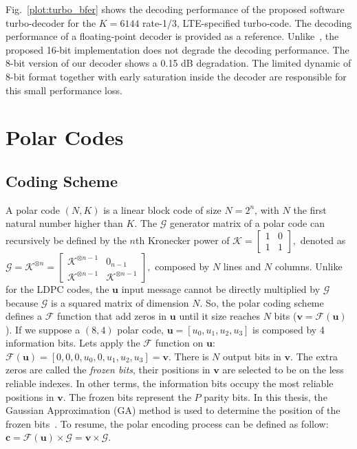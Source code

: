 Fig.~\ref{plot:turbo_bfer} shows the decoding performance of the proposed
software turbo-decoder for the $K = 6144$ rate-1/3, LTE-specified turbo-code.
The decoding performance of a floating-point decoder is provided as a reference.
Unlike~\cite{Wu2013}, the proposed 16-bit implementation does not degrade the
decoding performance. The 8-bit version of our decoder shows a 0.15 dB
degradation. The limited dynamic of 8-bit format together with early saturation
inside the decoder are responsible for this small performance loss.

\section{Polar Codes}
\label{sec:alg_polar_decoders}

\subsection{Coding Scheme}

A polar code $(N,K)$ is a linear block code of size $N = 2^n$, with $N$ the
first natural number higher than $K$. The $\bm{\mathcal{G}}$ generator matrix of
a polar code can recursively be defined by the $n$th Kronecker power of
$\bm{\mathcal{K}} =
\begin{bmatrix}
1 & 0 \\
1 & 1
\end{bmatrix},$
denoted as
$
\bm{\mathcal{G}} = \bm{\mathcal{K}}^{\otimes n} =
\begin{bmatrix}
\bm{\mathcal{K}}^{\otimes n-1} & 0_{n -1} \\
\bm{\mathcal{K}}^{\otimes n-1} & \bm{\mathcal{K}}^{\otimes n-1}
\end{bmatrix},
$
composed by $N$ lines and $N$ columns. Unlike for the LDPC codes, the $\bm{u}$
input message cannot be directly multiplied by $\bm{\mathcal{G}}$ because
$\bm{\mathcal{G}}$ is a squared matrix of dimension $N$. So, the polar coding
scheme defines a $\mathcal{F}$ function that add zeros in $\bm{u}$ until it size
reaches $N$ bits ($\bm{v} = \mathcal{F}(\bm{u})$). If we suppose a $(8,4)$ polar
code, $\bm{u} = [u_0, u_1, u_2, u_3]$ is composed by 4 information bits. Lets
apply the $\mathcal{F}$ function on $\bm{u}$: $\mathcal{F}(\bm{u}) =
[0, 0, 0, u_0, 0, u_1, u_2, u_3] = \bm{v}$. There is $N$ output bits in
$\bm{v}$. The extra zeros are called the \emph{frozen bits}, their positions in
$\bm{v}$ are selected to be on the less reliable indexes. In other terms, the
information bits occupy the most reliable positions in $\bm{v}$. The frozen bits
represent the $P$ parity bits. In this thesis, the Gaussian Approximation (GA)
method is used to determine the position of the frozen bits~\cite{Trifonov2012}.
To resume, the polar encoding process can be defined as follow: $\bm{c} =
\mathcal{F}(\bm{u}) \times \bm{\mathcal{G}} = \bm{v} \times \bm{\mathcal{G}}$.

